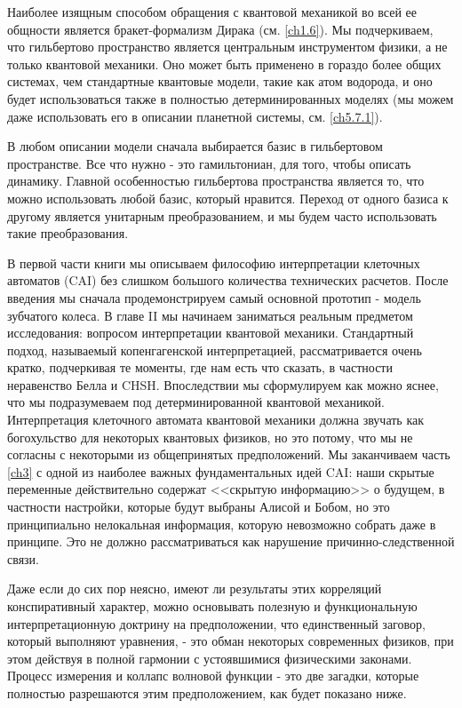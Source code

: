 \documentclass[main.tex]{subfiles}
\begin{document}
Наиболее изящным способом обращения с квантовой механикой во всей ее общности является бракет-формализм Дирака (см. \ref{ch1.6}). Мы подчеркиваем, что гильбертово пространство является центральным инструментом физики, а не только квантовой механики. Оно может быть применено в гораздо более общих системах, чем стандартные квантовые модели, такие как атом водорода, и оно будет использоваться также в полностью детерминированных моделях (мы можем даже использовать его в описании планетной системы, см. \ref{ch5.7.1}). 

В любом описании модели сначала выбирается базис в гильбертовом пространстве. Все что нужно - это гамильтониан, для того, чтобы описать динамику. Главной особенностью гильбертова пространства является то, что можно использовать любой базис, который нравится. Переход от одного базиса к другому является унитарным преобразованием, и мы будем часто использовать такие преобразования. 

В первой части книги мы описываем философию интерпретации клеточных автоматов (CAI) без слишком большого количества технических расчетов. После введения мы сначала продемонстрируем самый основной прототип - модель зубчатого колеса. В главе II мы начинаем заниматься реальным предметом исследования: вопросом интерпретации квантовой механики. Стандартный подход, называемый копенгагенской интерпретацией, рассматривается очень кратко, подчеркивая те моменты, где нам есть что сказать, в частности неравенство Белла и CHSH. Впоследствии мы сформулируем как можно яснее, что мы подразумеваем под детерминированной квантовой механикой. 
Интерпретация клеточного автомата квантовой механики должна звучать как богохульство для некоторых квантовых физиков, но это потому, что мы не согласны с некоторыми из общепринятых предположений. Мы заканчиваем часть \ref{ch3} с одной из наиболее важных фундаментальных идей CAI: наши скрытые переменные действительно содержат <<скрытую информацию>> о будущем, в частности настройки, которые будут выбраны Алисой и Бобом, но это принципиально нелокальная информация, которую невозможно собрать даже в принципе. Это не должно рассматриваться как нарушение причинно-следственной связи. 

Даже если до сих пор неясно, имеют ли результаты этих корреляций конспиративный характер, можно основывать полезную и функциональную интерпретационную доктрину на предположении, что единственный заговор, который выполняют уравнения, - это обман некоторых современных физиков, при этом действуя в полной гармонии с устоявшимися физическими законами. Процесс измерения и коллапс волновой функции - это две загадки, которые полностью разрешаются этим предположением, как будет показано ниже. 
\end{document}
